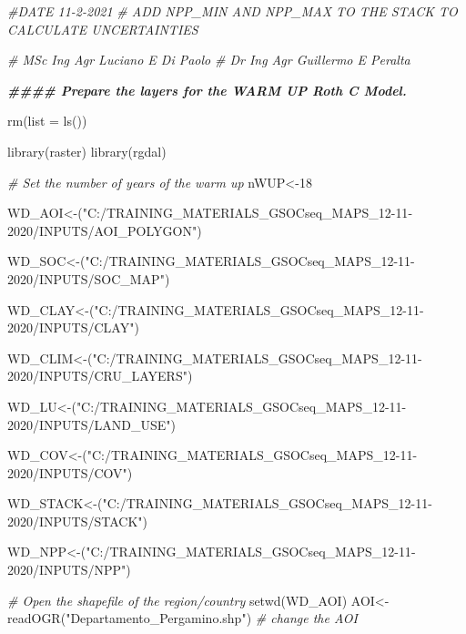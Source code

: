 \documentclass[
  10pt,
  b5paper,
]{book}
\newenvironment{Shaded}{\begin{snugshade}}{\end{snugshade}}
\newcommand{\AttributeTok}[1]{\textcolor[rgb]{0.77,0.63,0.00}{#1}}
\newcommand{\CommentTok}[1]{\textcolor[rgb]{0.56,0.35,0.01}{\textit{#1}}}
\newcommand{\DecValTok}[1]{\textcolor[rgb]{0.00,0.00,0.81}{#1}}
\newcommand{\DocumentationTok}[1]{\textcolor[rgb]{0.56,0.35,0.01}{\textbf{\textit{#1}}}}
\newcommand{\FunctionTok}[1]{\textcolor[rgb]{0.00,0.00,0.00}{#1}}
\newcommand{\NormalTok}[1]{#1}
\newcommand{\OtherTok}[1]{\textcolor[rgb]{0.56,0.35,0.01}{#1}}
\newcommand{\StringTok}[1]{\textcolor[rgb]{0.31,0.60,0.02}{#1}}
\begin{document}
\begin{Shaded}
\begin{Highlighting}[]
\CommentTok{\#DATE 11{-}2{-}2021}
\CommentTok{\# ADD NPP\_MIN AND NPP\_MAX TO THE STACK TO CALCULATE UNCERTAINTIES}

\CommentTok{\# MSc Ing Agr Luciano E Di Paolo}
\CommentTok{\# Dr Ing Agr Guillermo E Peralta}


\DocumentationTok{\#\#\#\# Prepare the layers for the WARM UP Roth C Model. }

\FunctionTok{rm}\NormalTok{(}\AttributeTok{list =} \FunctionTok{ls}\NormalTok{())}

\FunctionTok{library}\NormalTok{(raster)}
\FunctionTok{library}\NormalTok{(rgdal)}

\CommentTok{\# Set the number of years of the warm up}
\NormalTok{nWUP}\OtherTok{\textless{}{-}}\DecValTok{18}

\NormalTok{WD\_AOI}\OtherTok{\textless{}{-}}\NormalTok{(}\StringTok{"C:/TRAINING\_MATERIALS\_GSOCseq\_MAPS\_12{-}11{-}2020/INPUTS/AOI\_POLYGON"}\NormalTok{)}

\NormalTok{WD\_SOC}\OtherTok{\textless{}{-}}\NormalTok{(}\StringTok{"C:/TRAINING\_MATERIALS\_GSOCseq\_MAPS\_12{-}11{-}2020/INPUTS/SOC\_MAP"}\NormalTok{)}

\NormalTok{WD\_CLAY}\OtherTok{\textless{}{-}}\NormalTok{(}\StringTok{"C:/TRAINING\_MATERIALS\_GSOCseq\_MAPS\_12{-}11{-}2020/INPUTS/CLAY"}\NormalTok{)}

\NormalTok{WD\_CLIM}\OtherTok{\textless{}{-}}\NormalTok{(}\StringTok{"C:/TRAINING\_MATERIALS\_GSOCseq\_MAPS\_12{-}11{-}2020/INPUTS/CRU\_LAYERS"}\NormalTok{)}

\NormalTok{WD\_LU}\OtherTok{\textless{}{-}}\NormalTok{(}\StringTok{"C:/TRAINING\_MATERIALS\_GSOCseq\_MAPS\_12{-}11{-}2020/INPUTS/LAND\_USE"}\NormalTok{)}

\NormalTok{WD\_COV}\OtherTok{\textless{}{-}}\NormalTok{(}\StringTok{"C:/TRAINING\_MATERIALS\_GSOCseq\_MAPS\_12{-}11{-}2020/INPUTS/COV"}\NormalTok{)}

\NormalTok{WD\_STACK}\OtherTok{\textless{}{-}}\NormalTok{(}\StringTok{"C:/TRAINING\_MATERIALS\_GSOCseq\_MAPS\_12{-}11{-}2020/INPUTS/STACK"}\NormalTok{)}

\NormalTok{WD\_NPP}\OtherTok{\textless{}{-}}\NormalTok{(}\StringTok{"C:/TRAINING\_MATERIALS\_GSOCseq\_MAPS\_12{-}11{-}2020/INPUTS/NPP"}\NormalTok{)}


\CommentTok{\# Open the shapefile of the region/country}
\FunctionTok{setwd}\NormalTok{(WD\_AOI)}
\NormalTok{AOI}\OtherTok{\textless{}{-}}\FunctionTok{readOGR}\NormalTok{(}\StringTok{"Departamento\_Pergamino.shp"}\NormalTok{) }\CommentTok{\# change the AOI}


\end{Highlighting}
\end{Shaded}
\end{document}
